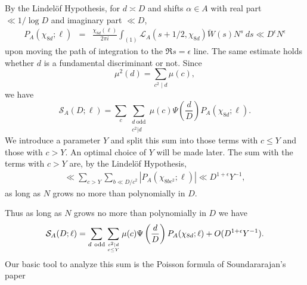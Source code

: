 \documentclass[12pt]{amsart}
\begin{document}
	By  the Lindel\"{o}f Hypothesis, for $d \asymp D$ and shifts $\alpha \in A$ with real part $\ll 1/\log D$ and imaginary part $\ll D$,
	\begin{eqnarray*}
		P_A(\chi_{8d};\ell) &=&\frac{\chi_{8d}(\ell)}{2\pi i} \int_{(1)} \mathcal L_A(s+1/2,\chi_{8d}) \breve W(s) N^s  ~ds\ll  D^\epsilon N^\epsilon
	\end{eqnarray*}
	upon  moving the path of integration to the $\Re s=\epsilon $ line.  The same estimate holds whether $d$ is a fundamental 
	discriminant or not. 
	Since
	$$\mu^2(d)=\sum_{c^2\mid d}\mu(c),$$
	we have 
	$$\mathcal S_{A}(D;\ell)=\sum_c \sum_{\substack{d  ~ \textrm{odd} \\ c^2|d}} \mu(c) \Psi\left(\frac {d} D\right) P_A(\chi_{8d};\ell) .$$
	We introduce a parameter $Y$ and split this sum into those terms with $c\le Y$ and those with $c>Y$. An optimal choice of $Y$ will be made later. The sum with the terms with $c>Y$ are, by the Lindel\"{o}f Hypothesis,
	\begin{eqnarray*}
		\ll \sum_{c>Y} \sum_{b \ll D/c^2} |P_A(\chi_{8b c^2};\ell)|\ll  D^{1+\epsilon} Y^{-1},
	\end{eqnarray*}
	as long as $N$ grows no more than polynomially in $D$.
	
	Thus as long as $N$ grows no more than polynomially in $D$ we have 
	\begin{eqnarray*}
		\mathcal S_A(D;\ell)= \sum_{d  ~ \textrm{odd}} \sum_{c^2\mid d \atop c\le Y }\mu(c) \Psi\left(\frac {d} D\right) P_{A}(\chi_{8d};\ell) +O(D^{1+\epsilon} Y^{-1}).
	\end{eqnarray*}
	Our basic tool to analyze this sum is the Poisson formula of Soundararajan's paper \cite[Lem 2.6]{Sou}
	
\end{document}
